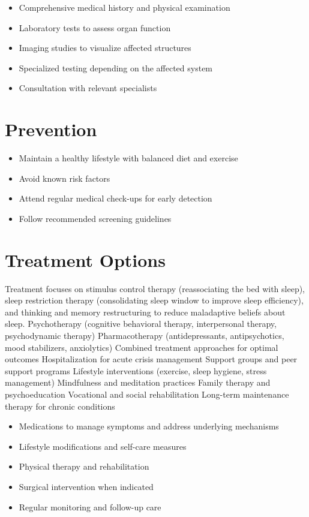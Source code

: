 \begin{itemize}[noitemsep]
  \item Comprehensive medical history and physical examination
  \item Laboratory tests to assess organ function
  \item Imaging studies to visualize affected structures
  \item Specialized testing depending on the affected system
  \item Consultation with relevant specialists
\end{itemize}
\section{Prevention}
\begin{itemize}[noitemsep]
  \item Maintain a healthy lifestyle with balanced diet and exercise
  \item Avoid known risk factors
  \item Attend regular medical check-ups for early detection
  \item Follow recommended screening guidelines
\end{itemize}
\section{Treatment Options}
Treatment focuses on stimulus control therapy (reassociating the bed with sleep), sleep restriction therapy (consolidating sleep window to improve sleep efficiency), and thinking and memory restructuring to reduce maladaptive beliefs about sleep. Psychotherapy (cognitive behavioral therapy, interpersonal therapy, psychodynamic therapy) Pharmacotherapy (antidepressants, antipsychotics, mood stabilizers, anxiolytics) Combined treatment approaches for optimal outcomes Hospitalization for acute crisis management Support groups and peer support programs Lifestyle interventions (exercise, sleep hygiene, stress management) Mindfulness and meditation practices Family therapy and psychoeducation Vocational and social rehabilitation Long-term maintenance therapy for chronic conditions

\begin{itemize}[noitemsep]
  \item Medications to manage symptoms and address underlying mechanisms
  \item Lifestyle modifications and self-care measures
  \item Physical therapy and rehabilitation
  \item Surgical intervention when indicated
  \item Regular monitoring and follow-up care
\end{itemize}
